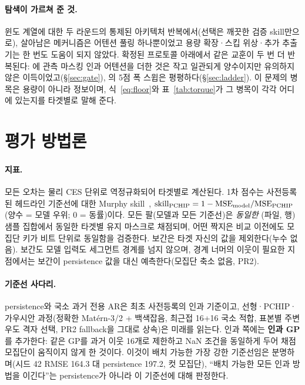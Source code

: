 \documentclass[10pt,a4paper]{article}
\begin{document}
\paragraph{탐색이 가르쳐 준 것.}
윈도 계열에 대한 두 라운드의 통제된 아키텍처 반복에서(선택은 깨끗한 검증
skill만으로), 살아남은 메커니즘은 어텐션 풀링 하나뿐이었고 용량 확장·스킵
위상·추가 추출기는 한 번도 도움이 되지 않았다. 확정된 프로토콜 아래에서 같은
교훈이 두 번 더 반복된다: \seqv{}에 관측 마스킹 인과 어텐션을 더한 것은 작고
일관되게 양수이지만 유의하지 않은 이득이었고(\S\ref{sec:gate}), \seqv{}의
5점 폭 스윕은 평평하다(\S\ref{sec:ladder}). 이 문제의 병목은 용량이 아니라
정보이며, 식~\eqref{eq:floor}와 표~\ref{tab:torque}가 그 병목이 각각 어디에
있는지를 타겟별로 말해 준다.

\section{평가 방법론}
\label{sec:eval}

\paragraph{지표.}
모든 오차는 물리 CES 단위로 역정규화되어 타겟별로 계산된다. 1차 점수는
사전등록된 헤드라인 기준선에 대한 Murphy skill~\citep{murphy1988},
$\mathrm{skill}_{\mathrm{PCHIP}} = 1 - \mathrm{MSE}_{\mathrm{model}}/\mathrm{MSE}_{\mathrm{PCHIP}}$
(양수 = 모델 우위; 0 = 동률)이다. 모든 팔(모델과 모든 기준선)은 \emph{동일한}
(파일, 행) 샘플 집합에서 동일한 타겟별 유지 마스크로 채점되며, 어떤 짝지은 비교
이전에도 모집단 키가 비트 단위로 동일함을 검증한다. 보간은 타겟 자신의 값을
제외한다(누수 없음). 보간도 모델 입력도 세그먼트 경계를 넘지 않으며, 경계 너머의
이웃이 필요한 지점에서는 보간이 persistence 값을 대신 예측한다(모집단 축소
없음, PR2).

\paragraph{기준선 사다리.}
persistence와 국소 과거 전용 AR은 최초 사전등록의 인과 기준이고, 선형·PCHIP·
가우시안 과정(정확한 Matérn-3/2 + 백색잡음, 최근접 16+16 국소 적합, 표본별
주변우도 격자 선택, PR2 fallback을 그대로 상속)은 미래를 읽는다. 인과 쪽에는
\textbf{인과 GP}를 추가한다: 같은 GP를 과거 이웃 16개로 제한하고 NaN 조건을
동일하게 두어 채점 모집단이 움직이지 않게 한 것이다. 이것이 배치 가능한 가장
강한 기준선임은 분명하며(시드 42 \Ti{} RMSE 164.3 대 persistence 197.2, 컷
모집단), ``배치 가능한 모든 인과 방법을 이긴다''는 persistence가 아니라 이
기준선에 대해 판정한다.
\end{document}
